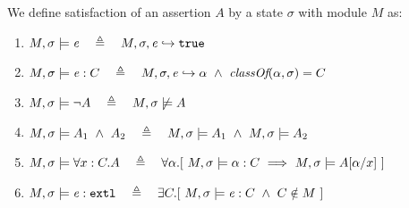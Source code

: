 \begin{definition} 
\label{def:chainmail-semantics}
We define satisfaction of an assertion $A$ by a %
state $\sigma$ with 
 module $M$ as:
\begin{enumerate}
\item
\label{cExpr}
$\satisfiesA{M}{\sigma}{{\re}}\ \ \ \triangleq \ \ \   \eval{M}{\sigma}{{\re}}{\true}$
\item
\label{cClass}
$M , \sigma \models {{\mathit{e}}} : C\ \ \ \triangleq \ \ \   M, \sigma, {\mathit{e}} \hookrightarrow \alpha\   \wedge \ \textit{classOf}(\alpha, \sigma)= C$
\item
$\satisfiesA{M}{\sigma}{\neg A}\ \ \ \triangleq \ \ \   {M},{\sigma}\not\models{A}$
\item
$\satisfiesA{M}{\sigma}{A_1\ \wedge\ A_2}\ \ \ \triangleq \ \ \   \satisfiesA{M}{\sigma}{A_1} \   \wedge \ \satisfiesA{M}{\sigma}{A_2}$

\item
\label{quant1}
$\satisfiesA{M}{\sigma}{\all{x:C}{A}} \ \ \ \triangleq \ \ \   
\forall \alpha.[\   \satisfiesA {M}{\sigma} {\alpha:C}  \ \Longrightarrow   \ \satisfiesA{M}{\sigma} {A[\alpha/x]} \ ] $

\item
\label{cExternal}
$\satisfiesA{M}{\sigma}{\external{{\re}}} \ \ \ \triangleq \ \ \  \exists C.[\ \satisfiesA{M}{\sigma}{{{\re}} : C} \ \wedge \ C \notin M \ ]$
\end{enumerate}
\end{definition}

 



